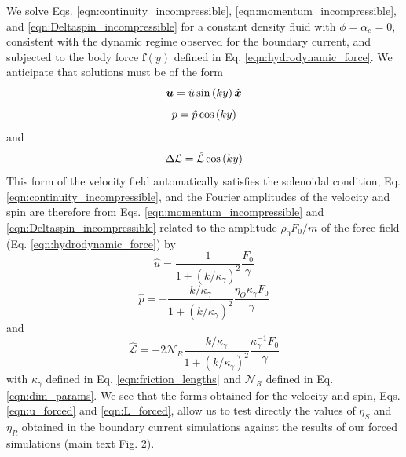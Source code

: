 \documentclass[%
 reprint,
superscriptaddress,
longbibliography,
 amsmath,amssymb,
 prl,
 citeautoscript,
]{revtex4-1}
\begin{document}
We solve Eqs. \ref{eqn:continuity_incompressible}, \ref{eqn:momentum_incompressible}, and \ref{eqn:Deltaspin_incompressible} for a constant density fluid with $\phi = \alpha_e = 0$, consistent with the dynamic regime observed for the boundary current, and subjected to the body force ${\boldsymbol f} \left( y \right)$ defined in Eq. \ref{eqn:hydrodynamic_force}. We anticipate that solutions must be of the form
\begin{equation}
{\boldsymbol u} = \hat{u} \, {\rm sin} \left( k y \right) \hat{\boldsymbol x}
\label{eqn:forced_velocity_solution_form}
\end{equation}
\begin{equation}
p = \hat{p} \, {\rm cos} \left( k y \right)
\label{eqn:forced_pressure_solution_form}
\end{equation}
and
\begin{equation}
\Delta \mathcal{L} = \hat{\mathcal{L}} \, {\rm cos} \left( k y \right)
\label{eqn:forced_velocity_solution_form}
\end{equation}
This form of the velocity field automatically satisfies the solenoidal condition, Eq. \ref{eqn:continuity_incompressible}, and the Fourier amplitudes of the velocity and spin are therefore from Eqs. \ref{eqn:momentum_incompressible} and \ref{eqn:Deltaspin_incompressible} related to the amplitude $\rho_0 F_0 / m$ of the force field (Eq. \ref{eqn:hydrodynamic_force}) by
\begin{equation}
\hat{u} = \frac{1}{1 + \left( k / \kappa_{\gamma} \right)^2} \frac{F_0}{\gamma}
\label{eqn:u_forced}
\end{equation}
\begin{equation}
\hat{p} = - \frac{k/\kappa_{\gamma}}{1 + \left( k / \kappa_{\gamma} \right)^2} \frac{\eta_O \kappa_{\gamma} F_0}{\gamma}
\label{eqn:p_forced}
\end{equation}
and
\begin{equation}
\hat{\mathcal{L}} = - 2 \mathcal{N}_R \frac{k/\kappa_{\gamma}}{1 + \left( k / \kappa_{\gamma} \right)^2} \frac{\kappa_{\gamma}^{-1} F_0}{\gamma}
\label{eqn:L_forced}
\end{equation}
with $\kappa_{\gamma}$ defined in Eq. \ref{eqn:friction_lengths} and $\mathcal{N}_R$ defined in Eq. \ref{eqn:dim_params}. We see that the forms obtained for the velocity and spin, Eqs. \ref{eqn:u_forced} and \ref{eqn:L_forced}, allow us to test directly the values of $\eta_S$ and $\eta_R$ obtained in the boundary current simulations against the results of our forced simulations (main text Fig. 2).

%
\end{document}
